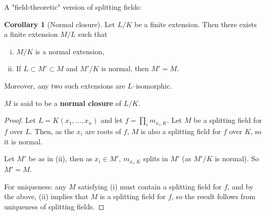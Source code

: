 \documentclass{article}
\theoremstyle{definition}
\newtheorem{cor}[theorem]{Corollary}
\begin{document}
A "field-theoretic" version of splitting fields:
\begin{cor}[Normal closure]
    Let $L/K$ be a finite extension. Then there exists a finite extension $M/L$ such that
    \begin{enumerate}[(i)]
        \item $M/K$ is a normal extension,
        \item If $L \subset M' \subset M$ and $M'/K$ is normal, then $M'=M$.
    \end{enumerate}
    Moreover, any two such extensions are $L$--isomorphic.
\end{cor}
$M$ is said to be a \textbf{normal closure} of $L/K$.
\begin{proof}
    Let $L=K(x_1,\ldots,x_n)$ and let $f = \prod_{i}^{} m_{x_i,K}$. Let $M$ be a splitting field for $f$ over $L$. Then, as the $x_i$ are roots of $f$, $M$ is also a splitting field for $f$ over $K$, so it is normal.

    Let $M'$ be as in (ii), then as $x_i \in M'$, $m_{x_i,K}$ splits in $M'$ (as $M'/K$ is normal). So $M'=M$.
    \vspace{1mm}

    For uniqueness: any $M$ satisfying (i) must contain a splitting field for $f$, and by the above, (ii) implies that $M$ is a splitting field for $f$, so the result follows from uniqueness of splitting fields.
\end{proof}
\end{document}

